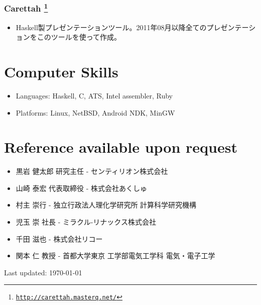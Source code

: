 \documentclass[letterpaper]{article}
\def\footer{
  \begin{center}
    \begin{footnotesize}
      Last updated: \today
    \end{footnotesize}
  \end{center}
}
\begin{document}
\subsubsection*{Carettah \footnote{\href{http://carettah.masterq.net/}{\tt http://carettah.masterq.net/}}}
\begin{itemize}
\item Haskell製プレゼンテーションツール。2011年08月以降全てのプレゼンテーションをこのツールを使って作成。
\end{itemize}

\section*{Computer Skills}

\begin{itemize}
  \item Languages: Haskell, C, ATS, Intel assembler, Ruby
  \item Platforms: Linux, NetBSD, Android NDK, MinGW
\end{itemize}

\section*{Reference available upon request}

\begin{itemize}
  \item 黒岩 健太郎 研究主任 - センティリオン株式会社
  \item 山崎 泰宏 代表取締役 - 株式会社あくしゅ
  \item 村主 崇行 - 独立行政法人理化学研究所 計算科学研究機構
  \item 児玉 崇 社長 - ミラクル-リナックス株式会社
  \item 千田 滋也 - 株式会社リコー
  \item 関本 仁 教授 - 首都大学東京 工学部電気工学科 電気・電子工学
\end{itemize}

\bigskip
\footer
\end{document}
